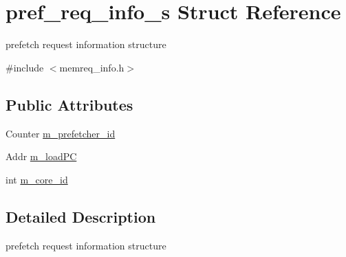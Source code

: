 \hypertarget{structpref__req__info__s}{
\section{pref\_\-req\_\-info\_\-s Struct Reference}
\label{structpref__req__info__s}
}


prefetch request information structure  




{\ttfamily \#include $<$memreq\_\-info.h$>$}

\subsection*{Public Attributes}
\begin{DoxyCompactItemize}
\item 
Counter \hyperlink{structpref__req__info__s_ae23c9357502e5b514a7024d559d83c93}{m\_\-prefetcher\_\-id}
\item 
Addr \hyperlink{structpref__req__info__s_a4388bf64a8a3106118239aaf9e581494}{m\_\-loadPC}
\item 
int \hyperlink{structpref__req__info__s_a44832dde3aa0bc84eb518a4d3e18a13c}{m\_\-core\_\-id}
\end{DoxyCompactItemize}


\subsection{Detailed Description}
prefetch request information structure 

